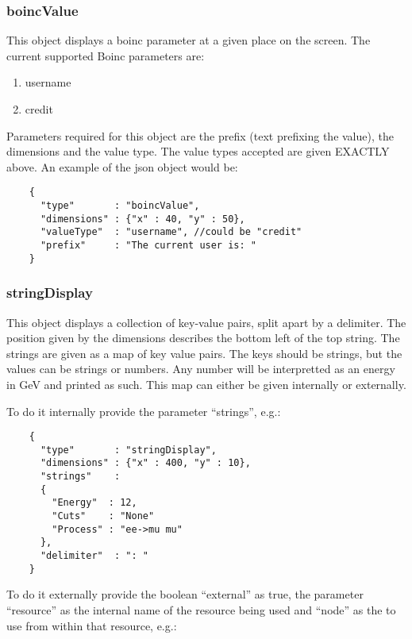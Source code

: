 \documentclass[a4paper]{article}
\begin{document}
  \subsubsection{boincValue}
  This object displays a boinc parameter at a given place on the screen.
  The current supported Boinc parameters are:

  \begin{enumerate}
    \item username
    \item credit
  \end{enumerate}

  Parameters required for this object are the prefix (text prefixing the
  value), the dimensions and the value type. The value types accepted are
  given EXACTLY above. An example of the json object would be:

  \begin{verbatim}
    {
      "type"       : "boincValue",
      "dimensions" : {"x" : 40, "y" : 50},
      "valueType"  : "username", //could be "credit"
      "prefix"     : "The current user is: "
    }
  \end{verbatim}

  \subsubsection{stringDisplay}
  This object displays a collection of key-value pairs, split apart by
  a delimiter. The position given by the dimensions describes the bottom
  left of the top string. The strings are given as a map of key value pairs.
  The keys should be strings, but the values can be strings or numbers. Any
  number will be interpretted as an energy in GeV and printed as such.
  This map can either be given internally or externally. 

  To do it internally provide the parameter ``strings'', e.g.:

  \begin{verbatim}
    {
      "type"       : "stringDisplay",
      "dimensions" : {"x" : 400, "y" : 10},
      "strings"    :
      {
        "Energy"  : 12,
        "Cuts"    : "None"
        "Process" : "ee->mu mu"
      },
      "delimiter"  : ": "
    }
  \end{verbatim}
  
  To do it externally provide the boolean ``external'' as true, the 
  parameter ``resource'' as the internal name of the resource being used 
  and ``node'' as the to use from within that resource, e.g.:
  
\end{document}

